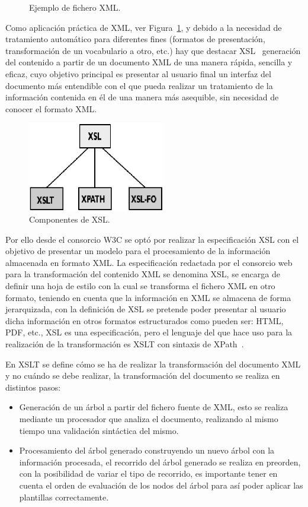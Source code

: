\begin{description}
\begin{figure}[!htbp]
\centering

\caption{Ejemplo de fichero XML.}
\label{fig:ejemplo-xml}
\end{figure}

Como aplicación práctica de XML, ver Figura~\ref{fig:ejemplo-xml}, y debido a la necesidad de tratamiento
automático para diferentes fines (formatos de presentación, transformación de un
vocabulario a otro, etc.) hay que destacar \gls{XSL}~\cite{XSL} generación del
contenido a partir de un documento XML de una manera rápida, sencilla y eficaz, cuyo objetivo principal es presentar al usuario final un 
interfaz del documento más entendible con el que pueda realizar un tratamiento de la información contenida en él de una manera más
asequible, sin necesidad de conocer el formato XML.

\begin{figure}[!htbp]
\centering
	\includegraphics[width=6cm]{images/xsl}
\caption{Componentes de XSL.}
\label{fig:xsl}
\end{figure}

Por ello desde el consorcio \gls{W3C} se optó por realizar la especificación XSL con
el objetivo de presentar un modelo para el procesamiento de la información
almacenada en formato XML. La especificación redactada por el consorcio web para la transformación del contenido XML
se denomina XSL, se encarga de definir una hoja de estilo con la cual se transforma el fichero
XML en otro formato, teniendo en cuenta que la información en XML se almacena de forma
jerarquizada, con la definición de XSL se pretende poder presentar al usuario dicha información
en otros formatos estructurados como pueden ser: HTML, \gls{PDF}, etc., XSL es una especificación, pero 
el lenguaje del que hace uso para la realización de la transformación es XSLT con sintaxis de XPath~\cite{XPath}.

En \gls{XSLT} se define cómo se ha de realizar la transformación del documento XML y no
cuándo se debe realizar, la transformación del documento se realiza en distintos
pasos: 
\begin{itemize}
    \item Generación de un árbol a partir del fichero fuente de XML, esto se
    realiza mediante un procesador que analiza el documento, realizando al mismo tiempo una validación sintáctica del
mismo.
\item Procesamiento del árbol generado construyendo un nuevo árbol con la
información procesada, el recorrido del árbol generado se realiza en preorden, con la posibilidad de variar el tipo de recorrido, es importante tener en cuenta
el orden de evaluación de los nodos del árbol para así poder aplicar las
plantillas correctamente. 
\end{itemize}


\end{description}
